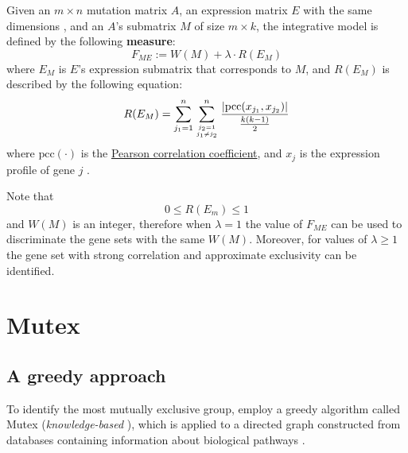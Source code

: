 \begin{definition}
    Given an $m \times n$ mutation matrix $A$, an expression matrix $E$ with the same dimensions , and an $A$'s submatrix $M$ of size $m \times k$, the integrative model is defined by the following \textbf{measure}: $$F_{ME} := W(M) + \lambda \cdot R(E_M)$$ where $E_M$ is $E$'s expression submatrix that corresponds to $M$, and $R(E_M)$ is described by the following equation: $$R(E_M) = \sum_{j_1 = 1}^n {\sum_{j_2 = 1 \atop j_1 \neq j_2} ^n {\dfrac{\left|\mathrm{pcc}(x_{j_1}, x_{j_2})\right|}{\frac{k(k - 1)}{2}}}}$$ where $\mathrm{pcc}(\cdot)$ is the \href{https://en.wikipedia.org/wiki/Pearson_correlation_coefficient}{Pearson correlation coefficient}, and $x_j$ is the expression profile of gene $j$ .
\end{definition}

Note that $$0 \le R(E_m) \le 1$$ and $W(M)$ is an integer, therefore when $\lambda = 1$ the value of $F_{ME}$ can be used to discriminate the gene sets with the same $W(M)$. Moreover, for values of $\lambda \ge 1$ the gene set with strong correlation and approximate exclusivity can be identified.

\section{Mutex}

\subsection{A greedy approach}

To identify the most mutually exclusive group, \textcite{mutex} employ a greedy algorithm called Mutex (\textit{knowledge-based} \cite{survey}), which is applied to a directed graph constructed from databases containing information about biological pathways .

